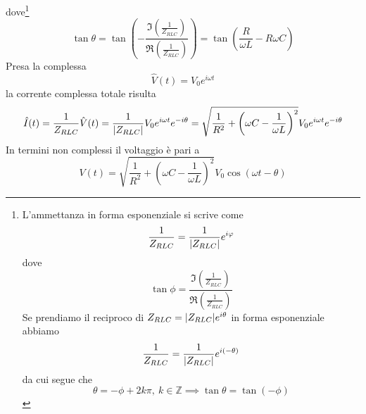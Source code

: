 dove\footnote{L'ammettanza in forma esponenziale si scrive come
\begin{equation*}
	\frac{1}{Z_{RLC}}=\frac{1}{\abs{Z_{RLC}}}e^{i\varphi}
\end{equation*}
dove
\begin{equation*}
	\tan\phi=\frac{\Im \left(\frac{1}{Z_{RLC}}\right)}{\Re \left(\frac{1}{Z_{RLC}}\right)}
\end{equation*}
Se prendiamo il reciproco di $Z_{RLC}=\abs{Z_{RLC}}e^{i\theta}$ in forma esponenziale abbiamo
\begin{equation*}
	\frac{1}{Z_{RLC}}=\frac{1}{\abs{Z_{RLC}}}e^{i(-\theta)}
\end{equation*}
da cui segue che
\begin{equation*}
	\theta = -\phi+2k\pi,\ k\in\mathbb{Z}\implies\tan \theta=\tan(-\phi)
\end{equation*}}
\begin{equation*}
	\tan\theta=\tan\left(-\frac{\Im \left(\frac{1}{Z_{RLC}}\right)}{\Re \left(\frac{1}{Z_{RLC}}\right)}\right)=\tan\left(\frac{R}{\omega L}-R\omega C\right)
\end{equation*}
Presa la \ddp complessa
\begin{equation*}
	\hat{V}(t)=V_0e^{i\omega t}
\end{equation*}
la corrente complessa totale risulta
\begin{equation*}
	\hat{I}(t)=\frac{1}{Z_{RLC}}\hat{V}(t)=\frac{1}{\abs{Z_{RLC}}}V_0e^{i\omega t}e^{-i\theta}=\sqrt{\frac{1}{R^2}+\left(\omega C-\frac{1}{\omega L}\right)^2}V_0e^{i\omega t}e^{-i\theta}
\end{equation*}
In termini non complessi il voltaggio è pari a
\begin{equation*}
	V(t)=\sqrt{\frac{1}{R^2}+\left(\omega C-\frac{1}{\omega L}\right)^2}V_0\cos(\omega t -\theta)
\end{equation*}